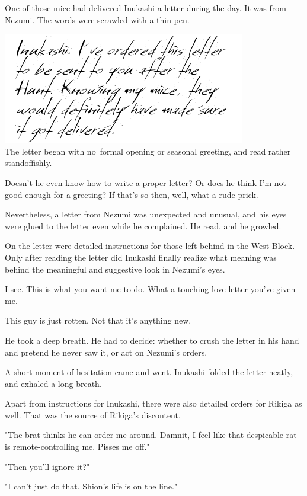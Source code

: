 One of those mice had delivered Inukashi a letter during the day. It was
from Nezumi. The words were scrawled with a thin pen.

\includegraphics{Images/memo7_nezu.png}\\

The letter began with no~formal opening or seasonal greeting, and read
rather standoffishly.

Doesn't he even know how to write a proper letter? Or does he think I'm
not good enough for a greeting? If that's so then, well, what a rude
prick.

Nevertheless, a letter from Nezumi was unexpected and unusual, and his
eyes were glued to the letter even while he complained. He read, and he
growled.

On the letter were detailed instructions for those left behind in the
West Block. Only after reading the letter did Inukashi finally realize
what meaning was behind the meaningful and suggestive look in Nezumi's
eyes.

I see. This is what you want me to do. What a touching love letter
you've given me.

This guy is just rotten. Not that it's anything new.

He took a deep breath. He had to decide: whether to crush the letter in
his hand and pretend he never saw it, or act on Nezumi's orders.

A short moment of hesitation came and went. Inukashi folded the letter
neatly, and exhaled a long breath.

Apart from instructions for Inukashi, there were also detailed orders
for Rikiga as well. That was the source of Rikiga's discontent.

"The brat thinks he can order me around. Damnit, I feel like that
despicable rat is remote-controlling me. Pisses me off."

"Then you'll ignore it?"

"I can't just do that. Shion's life is on the line."

